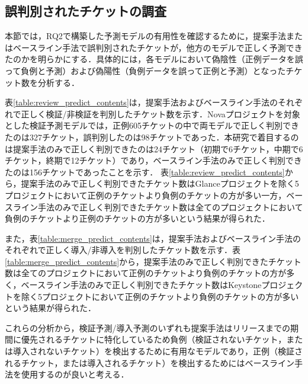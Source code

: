 \documentclass[T,J]{fose} %
\begin{document}
\subsection{誤判別されたチケットの調査}
本節では，RQ2で構築した予測モデルの有用性を確認するために，提案手法またはベースライン手法で誤判別されたチケットが，他方のモデルで正しく予測できたのかを明らかにする．具体的には，各モデルにおいて偽陰性（正例データを誤って負例と予測）および偽陽性（負例データを誤って正例と予測）となったチケット数を分析する．

表\ref{table:review_predict_contents}は，提案手法およびベースライン手法のそれぞれで正しく検証/非検証を判別したチケット数を示す．Novaプロジェクトを対象とした検証予測モデルでは，正例605チケットの中で両モデルで正しく判別できたのは327チケット，誤判別したのは98チケットであった．本研究で着目するのは提案手法のみで正しく判別できたのは24チケット（初期で6チケット，中期で6チケット，終期で12チケット）であり，ベースライン手法のみで正しく判別できたのは156チケットであったことを示す．
表\ref{table:review_predict_contents}から，提案手法のみで正しく判別できたチケット数はGlanceプロジェクトを除く5プロジェクトにおいて正例のチケットより負例のチケットの方が多い一方，ベースライン手法のみで正しく判別できたチケット数は全てのプロジェクトにおいて負例のチケットより正例のチケットの方が多いという結果が得られた．

また，表\ref{table:merge_predict_contents}は，提案手法およびベースライン手法のそれぞれで正しく導入/非導入を判別したチケット数を示す．表\ref{table:merge_predict_contents}から，提案手法のみで正しく判別できたチケット数は全てのプロジェクトにおいて正例のチケットより負例のチケットの方が多く，ベースライン手法のみで正しく判別できたチケット数はKeystoneプロジェクトを除く5プロジェクトにおいて正例のチケットより負例のチケットの方が多いという結果が得られた．

これらの分析から，検証予測/導入予測のいずれも提案手法はリリースまでの期間に優先されるチケットに特化しているため負例（検証されないチケット，または導入されないチケット）を検出するために有用なモデルであり，正例（検証されるチケット，または導入されるチケット）を検出するためにはベースライン手法を使用するのが良いと考える．
\end{document}
